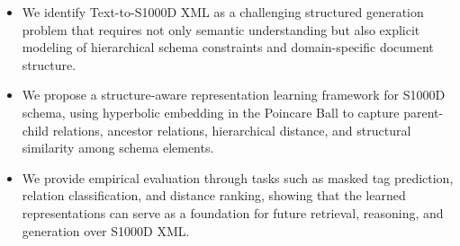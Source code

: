 \begin{itemize}
    \item We identify Text-to-S1000D XML as a challenging structured generation problem that requires not only semantic understanding but also explicit modeling of hierarchical schema constraints and domain-specific document structure.

    \item We propose a structure-aware representation learning framework for S1000D schema, using hyperbolic embedding in the Poincare Ball to capture parent-child relations, ancestor relations, hierarchical distance, and structural similarity among schema elements.
    
    \item We provide empirical evaluation through tasks such as masked tag prediction, relation classification, and distance ranking, showing that the learned representations can serve as a foundation for future retrieval, reasoning, and generation over S1000D XML.

\end{itemize}
